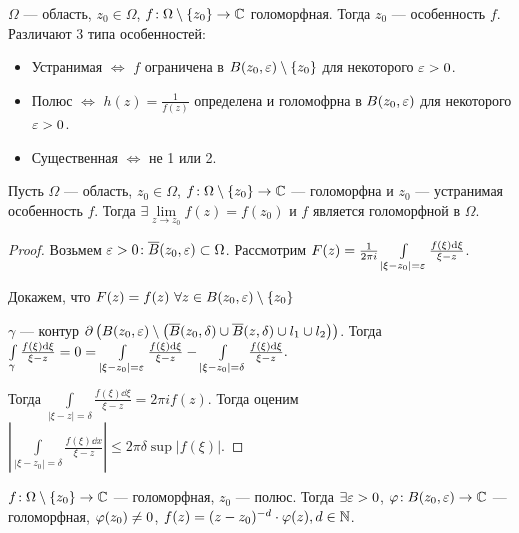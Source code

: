 \begin{definition}
    $\Omega$ --- область, $z_0 \in \Omega$,  $f\!: \Omega \setminus \left\{ z_0 \right\} \to \mathbb{C}$ голоморфная. Тогда $z_0$ --- особенность  $f$. Различают 3 типа особенностей:
    \begin{itemize}
        \item Устранимая $\iff$ $f$ ограничена в  $B(z_0, \varepsilon) \setminus \left\{ z_0 \right\} $ для некоторого $\varepsilon > 0$.
        \item Полюс  $\iff$ $h(z) = \frac{1}{f(z)}$ определена и голомофрна в $B(z_0, \varepsilon)$ для некоторого $\varepsilon > 0$.
        \item Существенная  $\iff$ не 1 или 2.
    \end{itemize}
\end{definition}
\begin{theorem}
    Пусть $\Omega$ --- область,  $z_0 \in \Omega$,  $f\!: \Omega \setminus \left\{ z_0 \right\} \to \mathbb{C}$ --- голоморфна и $z_0$ --- устранимая особенность  $f$. Тогда  $\exists \lim\limits_{z \to z_0} f(z) = f(z_0)$ и $f$ является голоморфной в  $\Omega$.
\end{theorem}
\begin{proof}
    Возьмем  $\varepsilon > 0\!: \overline{B}(z_0, \varepsilon) \subset \Omega$. Рассмотрим $F(z) = \frac{1}{2 \pi i} \int\limits_{|\xi - z_0| = \varepsilon} \frac{f(\xi) \mathrm{d}\xi}{\xi - z}$. 

    Докажем, что $F(z) = f(z)\ \forall z \in B(z_0, \varepsilon) \setminus \{z_0\}$ 

    $\gamma$ --- контур  $\partial \left( B(z_0, \varepsilon) \setminus \left( \overline{B}(z_0, \delta) \cup \overline{B}(z, \delta) \cup l_1 \cup l_2 \right)  \right)$. Тогда $\int\limits_{\gamma} \frac{f(\xi) \mathrm{d}\xi}{\xi - z} = 0 = \int\limits_{|\xi - z_0| = \varepsilon} \frac{f(\xi)\mathrm{d}\xi}{\xi - z} - \int\limits_{|\xi - z_0| = \delta} \frac{f(\xi) \mathrm{d}\xi}{\xi - z}.$

    Тогда $\int\limits_{|\xi - z| = \delta} \frac{f(\xi) \dd{\xi}}{\xi - z} = 2\pi i f(z)$. Тогда оценим $\left| \int\limits_{|\xi - z_0| = \delta} \frac{f(\xi) \dd{x}}{\xi - z} \right| \le 2 \pi \delta \sup |f(\xi)|$.
\end{proof}
\begin{lemma}
   $f\!: \Omega \setminus \left\{ z_0 \right\} \to \mathbb{C}$ --- голоморфная, $z_0$ --- полюс. Тогда  $\exists \varepsilon > 0$,  $\varphi\!: B(z_0, \varepsilon) \to \mathbb{C}$ --- голоморфная,  $\varphi(z_0) \neq 0$,  $f(z) = (z - z_0)^{-d} \cdot \varphi(z), d \in \mathbb{N}$. 
\end{lemma}

